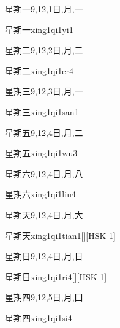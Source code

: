 \begin{Entry}{星期一}{9,12,1}{⽇,⽉,⼀}
  \begin{Phonetics}{星期一}{xing1qi1yi1}
  \end{Phonetics}
\end{Entry}

\begin{Entry}{星期二}{9,12,2}{⽇,⽉,⼆}
  \begin{Phonetics}{星期二}{xing1qi1er4}
  \end{Phonetics}
\end{Entry}

\begin{Entry}{星期三}{9,12,3}{⽇,⽉,⼀}
  \begin{Phonetics}{星期三}{xing1qi1san1}
  \end{Phonetics}
\end{Entry}

\begin{Entry}{星期五}{9,12,4}{⽇,⽉,⼆}
  \begin{Phonetics}{星期五}{xing1qi1wu3}
  \end{Phonetics}
\end{Entry}

\begin{Entry}{星期六}{9,12,4}{⽇,⽉,⼋}
  \begin{Phonetics}{星期六}{xing1qi1liu4}
  \end{Phonetics}
\end{Entry}

\begin{Entry}{星期天}{9,12,4}{⽇,⽉,⼤}
  \begin{Phonetics}{星期天}{xing1qi1tian1}[][HSK 1]
  \end{Phonetics}
\end{Entry}

\begin{Entry}{星期日}{9,12,4}{⽇,⽉,⽇}
  \begin{Phonetics}{星期日}{xing1qi1ri4}[][HSK 1]
  \end{Phonetics}
\end{Entry}

\begin{Entry}{星期四}{9,12,5}{⽇,⽉,⼞}
  \begin{Phonetics}{星期四}{xing1qi1si4}
  \end{Phonetics}
\end{Entry}

